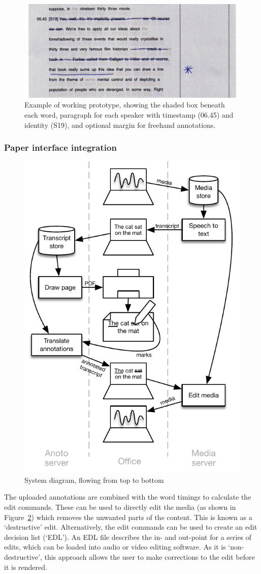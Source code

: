 \begin{figure}[h]
  \centering
  \includegraphics[width=\columnwidth]{figs/interface-darkened}
  \caption{Example of working prototype, showing the shaded box beneath each
    word, paragraph for each speaker with timestamp (06.45) and identity (S19),
    and optional margin for freehand annotations.}
  \label{fig:layout}
\end{figure}

\subsubsection{Paper interface integration}

\begin{figure}[ht]
  \centering
  \includegraphics[width=0.5\columnwidth]{figs/uist-sys-diagram}
  \caption{System diagram, flowing from top to bottom}
  \label{fig:diagram}
\end{figure}

The uploaded annotations are combined with the word timings to calculate the edit commands.  These can be used to
directly edit the media (as shown in Figure~\ref{fig:diagram}) which removes the unwanted parts of the content. This is
known as a `destructive' edit.  Alternatively, the edit commands can be used to create an edit decision list (`EDL').
An EDL file describes the in- and out-point for a series of edits, which can be loaded into audio or video editing
software.  As it is `non-destructive', this approach allows the user to make corrections to the edit before it is
rendered. 

